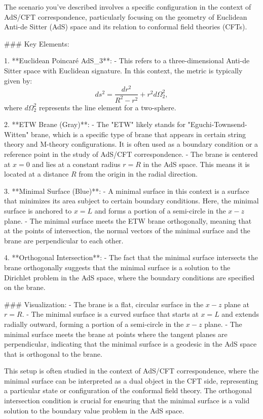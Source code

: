 The scenario you've described involves a specific configuration in the context of AdS/CFT correspondence, particularly focusing on the geometry of Euclidean Anti-de Sitter (AdS) space and its relation to conformal field theories (CFTs).

### Key Elements:

1. **Euclidean Poincaré AdS_3**:
   - This refers to a three-dimensional Anti-de Sitter space with Euclidean signature. In this context, the metric is typically given by:
     \[
     ds^2 = \frac{dr^2}{R^2 - r^2} + r^2 d\Omega_2^2,
     \]
     where \(d\Omega_2^2\) represents the line element for a two-sphere.

2. **ETW Brane (Gray)**:
   - The "ETW" likely stands for "Eguchi-Townsend-Witten" brane, which is a specific type of brane that appears in certain string theory and M-theory configurations. It is often used as a boundary condition or a reference point in the study of AdS/CFT correspondence.
   - The brane is centered at \(x=0\) and lies at a constant radius \(r=R\) in the AdS space. This means it is located at a distance \(R\) from the origin in the radial direction.

3. **Minimal Surface (Blue)**:
   - A minimal surface in this context is a surface that minimizes its area subject to certain boundary conditions. Here, the minimal surface is anchored to \(x=L\) and forms a portion of a semi-circle in the \(x-z\) plane.
   - The minimal surface meets the ETW brane orthogonally, meaning that at the points of intersection, the normal vectors of the minimal surface and the brane are perpendicular to each other.

4. **Orthogonal Intersection**:
   - The fact that the minimal surface intersects the brane orthogonally suggests that the minimal surface is a solution to the Dirichlet problem in the AdS space, where the boundary conditions are specified on the brane.

### Visualization:
- The brane is a flat, circular surface in the \(x-z\) plane at \(r=R\).
- The minimal surface is a curved surface that starts at \(x=L\) and extends radially outward, forming a portion of a semi-circle in the \(x-z\) plane.
- The minimal surface meets the brane at points where the tangent planes are perpendicular, indicating that the minimal surface is a geodesic in the AdS space that is orthogonal to the brane.

This setup is often studied in the context of AdS/CFT correspondence, where the minimal surface can be interpreted as a dual object in the CFT side, representing a particular state or configuration of the conformal field theory. The orthogonal intersection condition is crucial for ensuring that the minimal surface is a valid solution to the boundary value problem in the AdS space.